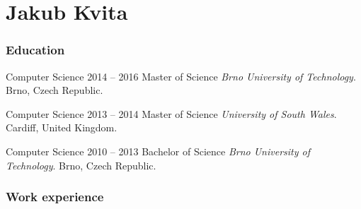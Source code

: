 \documentclass{tccv}
\begin{document}
\part{Jakub Kvita}

\section{Education}

\begin{yearlist}
	
	\item[Computer Science]{2014 -- 2016}
	{Master of Science}
	{\emph{Brno University of Technology}. Brno, Czech Republic.}
	
	\item[Computer Science]{2013 -- 2014}
	{Master of Science}
	{\emph{University of South Wales}. Cardiff, United Kingdom.}
	
	\item[Computer Science]{2010 -- 2013}
	{Bachelor of Science}
	{\emph{Brno University of Technology}. Brno, Czech Republic.}
	
\end{yearlist}

\section{Work experience}
\end{document}
